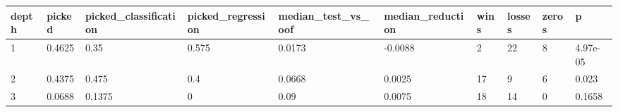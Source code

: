 \begin{tabular}{llllllllll}
\toprule
depth & picked & picked\_classification & picked\_regression & median\_test\_vs\_oof & median\_reduction & wins & losses & zeros & p \\
\midrule
1 & 0.4625 & 0.35 & 0.575 & 0.0173 & -0.0088 & 2 & 22 & 8 & 4.97e-05 \\
2 & 0.4375 & 0.475 & 0.4 & 0.0668 & 0.0025 & 17 & 9 & 6 & 0.023 \\
3 & 0.0688 & 0.1375 & 0 & 0.09 & 0.0075 & 18 & 14 & 0 & 0.1658 \\
\bottomrule
\end{tabular}
